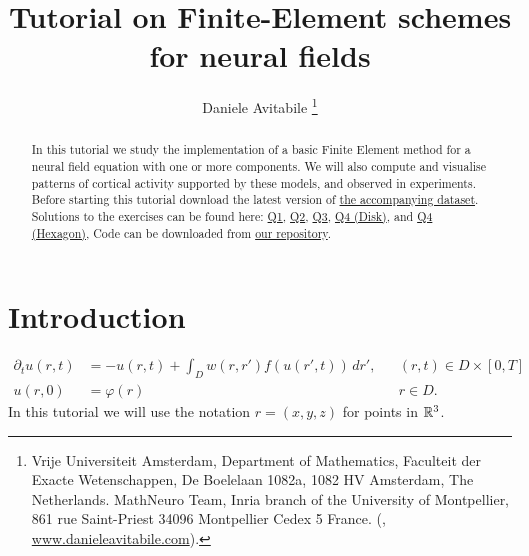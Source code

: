 \documentclass[a4paper]{siamonline220329}
\title{Tutorial on Finite-Element schemes for neural fields}
\author{ Daniele Avitabile
\thanks{ Vrije Universiteit Amsterdam, Department of
  Mathematics, Faculteit der Exacte Wetenschappen, De Boelelaan 1082a, 1082 HV
  Amsterdam, The Netherlands. \protect MathNeuro Team, Inria branch of the University
  of Montpellier, 861 rue Saint-Priest 34096 Montpellier Cedex 5 France. \protect
(\email{d.avitabile@vu.nl}, \url{www.danieleavitabile.com}). }
}
\theoremstyle{plain}
\renewcommand\phi\varphi
\begin{document}
\maketitle

\begin{abstract}
  In this tutorial we study the implementation of a basic Finite Element method for a
  neural field equation with one or more components. We will also compute and
  visualise patterns of cortical activity supported by these models, and observed in
  experiments. Before starting this tutorial download the latest version of
  \href{https://zenodo.org/records/11120604}{the accompanying
  dataset}. Solutions to the exercises can be found here:
  \href{http://htmlpreview.github.io/?https://github.com/danieleavitabile/numerical-analysis-mathematical-neuroscience/blob/main/Tutorials/Tutorial2/Solutions/Question1/html/driver.html}{Q1},
  \href{http://htmlpreview.github.io/?https://github.com/danieleavitabile/numerical-analysis-mathematical-neuroscience/blob/main/Tutorials/Tutorial2/Solutions/Question2/html/driver.html}{Q2},
  \href{http://htmlpreview.github.io/?https://github.com/danieleavitabile/numerical-analysis-mathematical-neuroscience/blob/main/Tutorials/Tutorial2/Solutions/Question3/html/driver.html}{Q3},
  \href{http://htmlpreview.github.io/?https://github.com/danieleavitabile/numerical-analysis-mathematical-neuroscience/blob/main/Tutorials/Tutorial2/Solutions/Question4/Disk/html/driver.html}{Q4 (Disk)},
  and
  \href{http://htmlpreview.github.io/?https://github.com/danieleavitabile/numerical-analysis-mathematical-neuroscience/blob/main/Tutorials/Tutorial2/Solutions/Question4/Hexagon/html/driver.html}{Q4 (Hexagon)},
  Code can be downloaded from
  \href{https://github.com/danieleavitabile/numerical-analysis-mathematical-neuroscience/tree/main}{our
  repository}.
\end{abstract}


\section{Introduction}\label{sec:introduction} 

\begin{equation}\label{eq:NF}
  \begin{aligned}
    \partial_{t} u(r,t) & = -u(r,t) + \int_{D} w(r,r') f(u(r',t))\,d r',
      && (r,t) \in D \times [0,T] \\
    u(r,0) & = \phi(r)
      && r \in D.
  \end{aligned}
\end{equation}
In this tutorial we will use the notation $r=(x,y,z)$ for points in $\mathbb{R}^3$.
\end{document}
